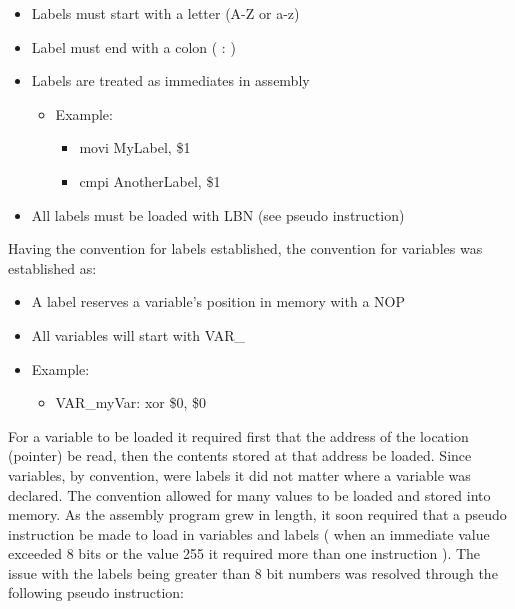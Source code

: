 \documentclass[letterpaper, 11 pt, conference]{article}
\begin{document}
\begin{itemize}
  \item Labels must start with a letter (A-Z or a-z)
  \item Label must end with a colon ( : )
  \item Labels are treated as immediates in assembly
\begin{itemize}
  \item Example:
\begin{itemize}
  \item movi MyLabel, \$1
  \item cmpi AnotherLabel, \$1
\end{itemize}
\end{itemize}
  \item All labels must be loaded with LBN (see pseudo instruction)
\end{itemize}


Having the convention for labels established, the convention for variables was established as:


\begin{itemize}
    \item A label reserves a variable's position in memory with a NOP
    \item All variables will start with VAR\_
    \item Example:
\begin{itemize}
    \item VAR\_myVar: xor \$0, \$0
\end{itemize}
\end{itemize}

For a variable to be loaded it required first that the address of the location (pointer) be read, then the contents stored at that address be loaded. Since variables, by convention, were labels it did not matter where a variable was declared. The convention allowed for many values to be loaded and stored into memory. As the assembly program grew in length, it soon required that a pseudo instruction be made to load in variables and labels ( when an immediate value exceeded 8 bits or the value 255 it required more than one instruction ). The issue with the labels being greater than 8 bit numbers was resolved through the following pseudo instruction:
\end{document}
